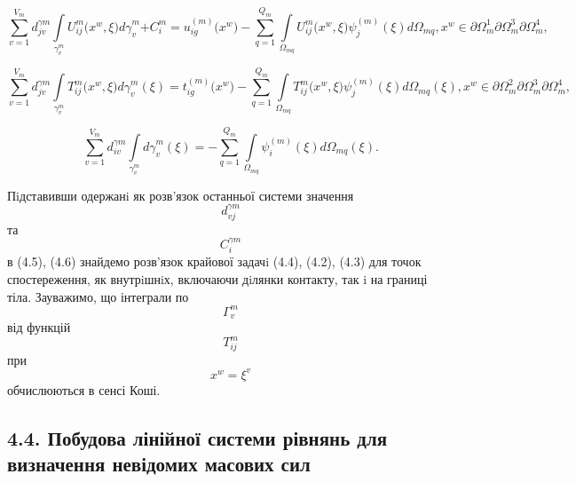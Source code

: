 \[{{\sum\limits_{v = 1}^{V_{m}}d_{\mathit{\text{jv}}}^{\mathit{\gamma m}}}{\int\limits_{\gamma_{v}^{m}}{U_{\mathit{\text{ij}}}^{m}{(x^{w}}{,\xi)\mathit{d\gamma}_{v}^{m}}}}{+ C_{i}^{m}}{= u_{\mathit{\text{ig}}}^{(m)}}{(x^{w}}{) - {\sum\limits_{q = 1}^{Q_{m}}{\int\limits_{\Omega_{\mathit{\text{mq}}}}{U_{\mathit{\text{ij}}}^{m}{(x^{w}}{,\xi)\psi_{j}^{(m)}}{(\xi)d\Omega_{\mathit{\text{mq}}}}{,x^{w}}{\in\partial\Omega_{m}^{1}}{\partial\Omega_{m}^{3}}{\partial\Omega_{m}^{4}}}}}},}{}\]

\[{{\sum\limits_{v = 1}^{V_{m}}d_{\mathit{\text{jv}}}^{\mathit{\gamma m}}}{\int\limits_{\gamma_{v}^{m}}{T_{\mathit{\text{ij}}}^{m}{(x^{w}}{,\xi)\mathit{d\gamma}_{v}^{m}}{(\xi)}}}{= t_{\mathit{\text{ig}}}^{(m)}}{(x^{w}}{) - {\sum\limits_{q = 1}^{Q_{m}}{\int\limits_{\Omega_{\mathit{\text{mq}}}}{T_{\mathit{\text{ij}}}^{m}{(x^{w}}{,\xi)\psi_{j}^{(m)}}{(\xi)d\Omega_{\mathit{\text{mq}}}}{(\xi),x^{w}}{\in\partial\Omega_{m}^{2}}{\partial\Omega_{m}^{3}}{\partial\Omega_{m}^{4}}}}}},}{}\]

\[{{\sum\limits_{v = 1}^{V_{m}}d_{\mathit{\text{iv}}}^{\mathit{\gamma m}}}{\int\limits_{\gamma_{v}^{m}}{\mathit{d\gamma}_{v}^{m}{(\xi)}}}{= {- {\sum\limits_{q = 1}^{Q_{m}}{\int\limits_{\Omega_{\mathit{\text{mq}}}}{\psi_{i}^{(m)}{(\xi)d\Omega_{\mathit{\text{mq}}}}{(\xi)\text{.}}}}}}}}{}\]

Пiдставивши одержанi як розв'язок останньої системи значення
\[d_{\mathit{\text{vj}}}^{\mathit{\gamma m}}{}\] та
\[C_{i}^{\mathit{\gamma m}}{}\] в (4.5), (4.6) знайдемо розв'язок
крайової задачi (4.4), (4.2), (4.3) для точок спостереження, як
внутрiшнiх, включаючи дiлянки контакту, так i на границі тіла.
Зауважимо, що інтеграли по \[\Gamma_{v}^{m}{}\] від функцій
\[T_{\mathit{\text{ij}}}^{m}{}\] при \[{x^{w} = \xi^{v}}{}\]
обчислюються в сенсі Коші.

\hypertarget{ux43fux43eux431ux443ux434ux43eux432ux430-ux43bux456ux43dux456ux439ux43dux43eux457-ux441ux438ux441ux442ux435ux43cux438-ux440ux456ux432ux43dux44fux43dux44c-ux434ux43bux44f-ux432ux438ux437ux43dux430ux447ux435ux43dux43dux44f-ux43dux435ux432ux456ux434ux43eux43cux438ux445-ux43cux430ux441ux43eux432ux438ux445-ux441ux438ux43b-1}{%
\subsection[4.4. Побудова лінійної системи рівнянь для визначення
невідомих масових
сил]{\texorpdfstring{\protect\hypertarget{anchor-57}{}{}4.4. Побудова
лінійної системи рівнянь для визначення невідомих масових
сил}{4.4. Побудова лінійної системи рівнянь для визначення невідомих масових сил}}\label{ux43fux43eux431ux443ux434ux43eux432ux430-ux43bux456ux43dux456ux439ux43dux43eux457-ux441ux438ux441ux442ux435ux43cux438-ux440ux456ux432ux43dux44fux43dux44c-ux434ux43bux44f-ux432ux438ux437ux43dux430ux447ux435ux43dux43dux44f-ux43dux435ux432ux456ux434ux43eux43cux438ux445-ux43cux430ux441ux43eux432ux438ux445-ux441ux438ux43b-1}}


